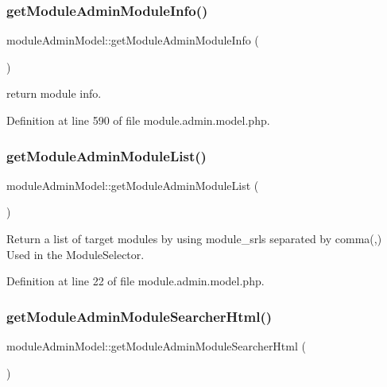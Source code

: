 \subsubsection{\texorpdfstring{get\+Module\+Admin\+Module\+Info()}{getModuleAdminModuleInfo()}}
{\footnotesize\ttfamily module\+Admin\+Model\+::get\+Module\+Admin\+Module\+Info (\begin{DoxyParamCaption}{ }\end{DoxyParamCaption})}

return module info. 

Definition at line 590 of file module.\+admin.\+model.\+php.

\hypertarget{classmoduleAdminModel_ab87a76519a343b50db20d17983b4d2c7}{}\label{classmoduleAdminModel_ab87a76519a343b50db20d17983b4d2c7} 
\subsubsection{\texorpdfstring{get\+Module\+Admin\+Module\+List()}{getModuleAdminModuleList()}}
{\footnotesize\ttfamily module\+Admin\+Model\+::get\+Module\+Admin\+Module\+List (\begin{DoxyParamCaption}{ }\end{DoxyParamCaption})}



Return a list of target modules by using module\+\_\+srls separated by comma(,) Used in the Module\+Selector. 



Definition at line 22 of file module.\+admin.\+model.\+php.

\hypertarget{classmoduleAdminModel_aca064d49155437d5cad912d1f885933f}{}\label{classmoduleAdminModel_aca064d49155437d5cad912d1f885933f} 
\subsubsection{\texorpdfstring{get\+Module\+Admin\+Module\+Searcher\+Html()}{getModuleAdminModuleSearcherHtml()}}
{\footnotesize\ttfamily module\+Admin\+Model\+::get\+Module\+Admin\+Module\+Searcher\+Html (\begin{DoxyParamCaption}{ }\end{DoxyParamCaption})}

